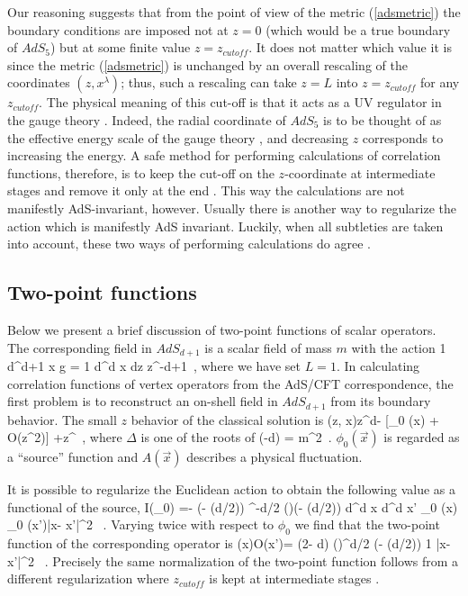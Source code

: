 \documentclass[12pt]{article}
\begin{document}
Our reasoning suggests
that from the point of view of the metric (\ref{adsmetric})
the boundary conditions are imposed not at $z=0$ 
(which would be a true boundary 
of $AdS_5$) but at some finite value $z= z_{cutoff}$.
It does not matter which value it is since 
the metric (\ref{adsmetric}) is unchanged by an
overall rescaling of the coordinates $(z, x^{\lambda})$; thus,
such a rescaling can take $z=L$ into $z= z_{cutoff}$ for any
$z_{cutoff}$.
The physical meaning of this cut-off is that it acts as a UV
regulator in the gauge theory \cite{US,sw}. Indeed, the radial coordinate of
$AdS_5$ is to be thought of as the effective energy scale of the gauge
theory \cite{jthroat}, and decreasing $z$ corresponds to increasing
the energy. 
A safe method for performing calculations of correlation
functions, therefore, is
to keep the cut-off on the $z$-coordinate at intermediate stages
and remove it only at the end \cite{US,freed}. This way the calculations are
not manifestly AdS-invariant, however. Usually there is another way to
regularize the action which is manifestly AdS invariant. Luckily, when
all subtleties are taken into account, these two ways of performing 
calculations do agree \cite{KWnew,Haro}.

\subsection{Two-point functions}

Below we present a brief discussion of two-point functions
of scalar operators. The corresponding field in $AdS_{d+1}$ is a scalar
field of mass $m$ with the action
\be
{1} \int d^{d+1} x \sqrt g
=
{1} \int d^d x dz  z^{-d+1}
\ ,
\ee
where we have set $L=1$.
In calculating correlation functions of vertex
operators from the AdS/CFT correspondence,
the first problem is to reconstruct an on-shell field in $AdS_{d+1}$
from its boundary behavior. 
The small $z$ behavior of the classical solution is
\be \label{bc}
\phi (z, \vec x)\rightarrow z^{d-\Delta}
[\phi_0 (\vec x) + O(z^2)]
+z^\Delta [A(\vec x) + O(z^2)] \ ,
\ee
where $\Delta$ is one of the roots of
\be \label{relation}
\Delta (\Delta -d) = m^2\ .
\ee
$\phi_0 (\vec x)$ is regarded as a ``source'' function and
$A(\vec x)$
describes a physical fluctuation.

It is possible to regularize the Euclidean
action \cite{KWnew}
to obtain the following value as a functional of the source,
\be
I(\phi_0) =- (\Delta- (d/2)) \pi^{-d/2}
{\Gamma (\Delta)\over \Gamma (\Delta-
(d/2))}
\int d^d \vec x \int d^d \vec x'
{\phi_0 (\vec x) \phi_0 (\vec x')\over |\vec x- \vec x'|^{2\Delta} }
\ .
\ee
Varying twice with respect to $\phi_0$ we find that the two-point
function of the corresponding operator is
\be \label{twopoint}
(\vec x){\cal  O}(\vec x')\rangle=
{(2\Delta - d) \Gamma (\Delta)\over \pi^{d/2} \Gamma (\Delta -
(d/2))} {1\over
|\vec x- \vec x'|^{2\Delta} }
\ .
\ee
Precisely the same normalization of the two-point function follows from a
different regularization where $z_{cutoff}$ is kept at intermediate stages
\cite{US,freed}.
\end{document}
